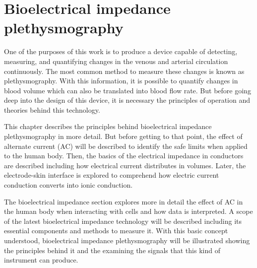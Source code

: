 
\chapter{Bioelectrical impedance plethysmography}  %
\label{chapter impedance}

\ifpdf
    \graphicspath{{Chapter3/Figs/Raster/}{Chapter3/Figs/PDF/}{Chapter3/Figs/}}
\else
    \graphicspath{{Chapter3/Figs/Vector/}{Chapter3/Figs/}}
\fi

One of the purposes of this work is to produce a device capable of detecting, measuring, and quantifying changes in the venous and arterial circulation continuously. The most common method to measure these changes is known as plethysmography. With this information, it is possible to quantify changes in blood volume which can also be translated into blood flow rate.  But before going deep into the design of this device, it is necessary the principles of operation and theories behind this technology. 

This chapter describes the principles behind bioelectrical impedance plethysmography in more detail. But before getting to that point, the effect of alternate current (AC) will be described to identify the safe limits when applied to the human body. Then, the basics of the electrical impedance in conductors are described including how electrical current distributes in volumes. Later, the electrode-skin interface is explored to comprehend how electric current conduction converts into ionic conduction. 

The bioelectrical impedance section explores more in detail the effect of AC in the human body when interacting with cells and how data is interpreted. A scope of the latest bioelectrical impedance technology will be described including its essential components and methods to measure it. With this basic concept understood, bioelectrical impedance plethysmography will be illustrated showing the principles behind it and the examining the signals that this kind of instrument can produce.  

